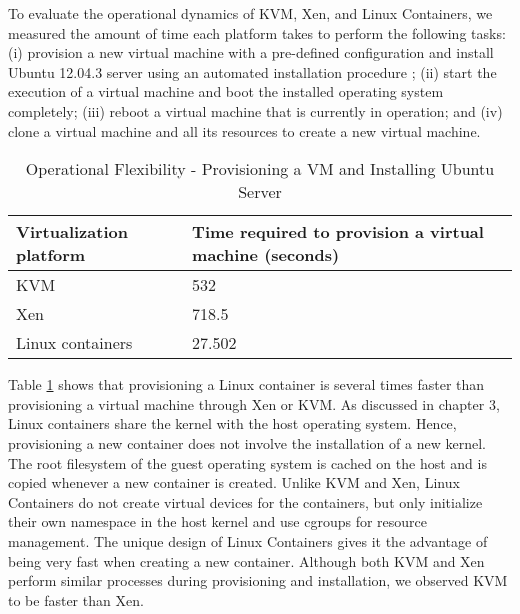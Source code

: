 To evaluate the operational dynamics of KVM, Xen, and Linux Containers, we measured the amount of time each platform takes to perform the following tasks:
(i) provision a new virtual machine with a pre-defined configuration and install Ubuntu 12.04.3 server using an automated installation procedure \cite{kickstart}; (ii) start the execution of a virtual machine and boot the installed operating system completely; (iii) reboot a virtual machine that is currently in operation; and (iv) clone a virtual machine and all its resources to create a new virtual machine.

\begin{table}[h!]
\begin{center}
\renewcommand{\arraystretch}{1.5}
\begin{tabular}{ | p{4.5cm} | p{9.5cm} |}
  \hline                        
  \textbf{Virtualization platform} & \textbf{Time required to provision a virtual machine (seconds)} \\ \hline
  KVM & 532 \\ \hline
  Xen & 718.5 \\ \hline
  Linux containers & 27.502 \\ 
  \hline  
\end{tabular}
\end{center}
\caption{Operational Flexibility - Provisioning a VM and Installing Ubuntu Server}
\label{table:provision}
\end{table}



Table \ref{table:provision} shows that provisioning a Linux container is several times faster than provisioning a virtual machine through Xen or KVM. As discussed in chapter 3, Linux containers share the kernel with the host operating system. Hence, provisioning a new container does not involve the installation of a new kernel. The root filesystem of the guest operating system is cached on the host and is copied whenever a new container is created. Unlike KVM and Xen, Linux Containers do not create virtual devices for the containers, but only initialize their own namespace in the host kernel and use cgroups for resource management. The unique design of Linux Containers gives it the advantage of being very fast when creating a new container. Although both KVM and Xen perform similar processes during provisioning and installation, we observed KVM to be faster than Xen. 

